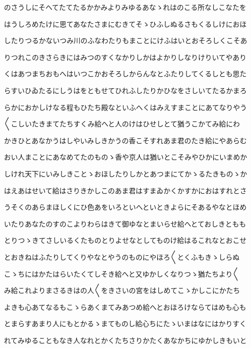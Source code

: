 \documentclass[a4paper,11pt,landscape]{ltjtarticle}
\begin{document}
\par\medskip
のさうしにそへてたてたるかかみよりみゆるあなゝれはのこる所なしこなたを
\par\medskip
はうしろめたけに思てあなたさまにむきてそゝひふしぬるさもくるしけにおほ
\par\medskip
したりつるかないつみ川のふなわたりもまことにけふはいとおそろしくこそあ
\par\medskip
りつれこのきさらきにはみつのすくなかりしかはよかりしなりけりいてやあり
\par\medskip
くはあつまちおもへはいつこかおそろしからんなとふたりしてくるしとも思た
\par\medskip
らすいひゐたるにしうはをともせてひれふしたりかひなをさしいてたるかまろ
\par\medskip
らかにおかしけなる程もひたち殿なといふへくはみえすまことにあてなりやう
\par\medskip
〱こしいたきまてたちすくみ給へと人のけはひせしとて猶うこかてみ給にわ
\par\medskip
かきひとあなかうはしやいみしきかうの香こそすれあま君のたき給にやあらむ
\par\medskip
おい人まことにあなめてたのものゝ香や京人は猶いとこそみやひかにいまめか
\par\medskip
しけれ天下にいみしきことゝおほしたりしかとあつまにてかゝるたきものゝか
\par\medskip
はえあはせいて給はさりきかしこのあま君はすまゐかくかすかにおはすれとさ
\par\medskip
うそくのあらまほしくにひ色あをいろといへといときよらにそあるやなとほめ
\par\medskip
いたりあなたのすのこよりわらはきて御ゆなとまいらせ給へとておしきともも
\par\medskip
とりつゝきてさしいるくたものとりよせなとしてものけ給はるこれなとおこせ
\par\medskip
とおきねはふたりしてくりやなとやうのものにやほろ〱とくふもきゝしらぬ
\par\medskip
こゝちにはかたはらいたくてしそき給へと又ゆかしくなりつゝ猶たちより〱
\par\medskip
み給これよりまさるきはの人〱をきさいの宮をはしめてこゝかしこにかたち
\par\medskip
よきも心あてなるもこゝらあくまてみあつめ給へとおほろけならてはめも心も
\par\medskip
とまらすあまり人にもとかるゝまてものし給心ちにたゝいまはなにはかりすく
\par\medskip
れてみゆることもなき人なれとかくたちさりかたくあなかちにゆかしきもいと
\par\medskip
\end{document}
